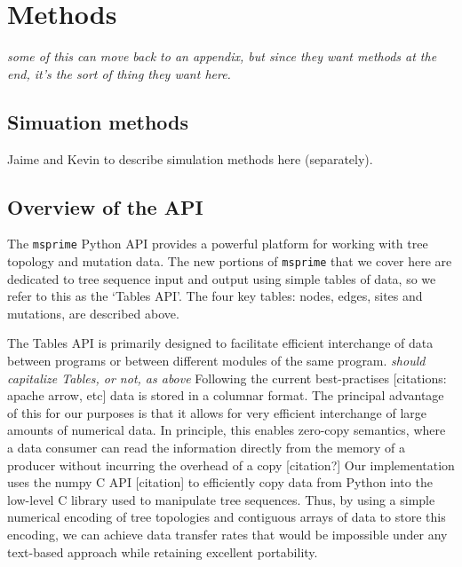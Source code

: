 \documentclass{article}
\newcommand{\msprime}{\texttt{msprime}}
\newcommand{\plr}[1]{{\em \color{blue} #1}}
\newcommand{\jda}[1]{{\em \color{cyan} #1}}
\begin{document}
\section*{Methods}

\plr{some of this can move back to an appendix, but since they want methods at the end,
it's the sort of thing they want here.}

\subsection*{Simuation methods}

Jaime and Kevin to describe simulation methods here (separately).

\subsection*{Overview of the API}

The \msprime{} Python API provides a powerful platform for working with tree topology and mutation data.
The new portions of \msprime{} that we cover here
are dedicated to tree sequence input and output using simple tables of data,
so we refer to this as the `Tables API'.
The four key tables: nodes, edges, sites and mutations, are described above.

The Tables API is primarily designed to facilitate efficient interchange of
data between programs or between different modules of the same program.
\jda{should capitalize Tables, or not, as above}
Following the current best-practises [citations: apache arrow, etc] data is stored
in a columnar format.
The principal advantage of this for our purposes is that it allows for very efficient
interchange of large amounts of numerical data. In principle, this enables
zero-copy semantics, where a data consumer can read the information directly
from the memory of a producer without incurring the overhead of a copy
[citation?] Our implementation uses the numpy C API [citation] to efficiently copy
data from Python into the low-level C library used to manipulate
tree sequences.
Thus, by using a simple numerical
encoding of tree topologies and contiguous arrays of data to store this
encoding, we can achieve data transfer rates that would be impossible under
any text-based approach while retaining excellent portability.
\end{document}
